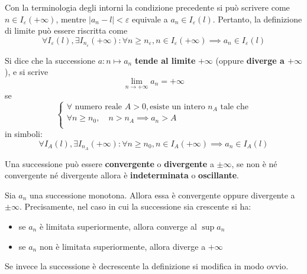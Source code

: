 \documentclass{book}
\begin{document}
\begin{curiosity}
    Con la terminologia degli intorni la condizione precedente si può scrivere come \(n \in I_\varepsilon(+\infty)\), mentre \(|a_n - l| < \varepsilon\) equivale a \(a_n \in I_\varepsilon(l)\).
    Pertanto, la definizione di limite può essere riscritta come
    \[
        \forall I_\varepsilon(l), \exists I_{n_\varepsilon}(+\infty) : \forall n \geq n_\varepsilon, n \in I_\varepsilon(+\infty) \implies a_n \in I_\varepsilon(l)
    \]
\end{curiosity}
\begin{definition}
    Si dice che la successione \( a : n \mapsto a_n \) \textbf{tende al limite} \(+\infty\) (oppure \textbf{diverge a \(+\infty\)}), e si scrive
    \[\lim_{n \to +\infty} a_n = +\infty\]
    se
    \[
        \begin{cases}
            \forall \text{ numero reale } A > 0, \text{esiste un intero } n_A \text{ tale che} \\
            \forall n \geq n_0, \quad n>n_A \implies a_n > A                                   \\
        \end{cases}
    \]
    in simboli:
    \[
        \forall I_A(l), \exists I_{n_A}(+\infty) : \forall n \geq n_0, n \in I_A(+\infty) \implies a_n \in I_A(l)
    \]
\end{definition}
\begin{proposition}
    Una successione può essere \textbf{convergente} o \textbf{divergente} a \(\pm\infty\), se non è né convergente né divergente allora è \textbf{indeterminata} o \textbf{oscillante}.
\end{proposition}

\begin{theorem}
    Sia \(a_n\) una successione monotona. Allora essa è convergente oppure divergente a \(\pm\infty\). Precisamente, nel caso in cui la successione sia crescente si ha:
    \begin{itemize}
        \item se \(a_n\) è limitata superiormente, allora converge al \(\sup a_n \)
        \item se \(a_n\) non è limitata superiormente, allora diverge a \(+\infty\)
    \end{itemize}
    Se invece la successione è decrescente la definizione si modifica in modo ovvio.
\end{theorem}
\end{document}
